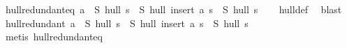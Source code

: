 \begin{isabellebody}
\endisatagproof
{\isafoldproof}%
%
\isadelimproof
\isanewline
%
\endisadelimproof
\isanewline
{}\isamarkupfalse%
\ hull{\isacharunderscore}{\kern0pt}redundant{\isacharunderscore}{\kern0pt}eq{\isacharcolon}{\kern0pt}\ {\isachardoublequoteopen}a\ {\isasymin}\ {\isacharparenleft}{\kern0pt}S\ hull\ s{\isacharparenright}{\kern0pt}\ {\isasymlongleftrightarrow}\ S\ hull\ {\isacharparenleft}{\kern0pt}insert\ a\ s{\isacharparenright}{\kern0pt}\ {\isacharequal}{\kern0pt}\ S\ hull\ s{\isachardoublequoteclose}\isanewline
%
\isadelimproof
\ \ %
\endisadelimproof
%
\isatagproof
{}\isamarkupfalse%
\ hull{\isacharunderscore}{\kern0pt}def\ \isamarkupfalse%
\ blast%
\endisatagproof
{\isafoldproof}%
%
\isadelimproof
\isanewline
%
\endisadelimproof
\isanewline
{}\isamarkupfalse%
\ hull{\isacharunderscore}{\kern0pt}redundant{\isacharcolon}{\kern0pt}\ {\isachardoublequoteopen}a\ {\isasymin}\ {\isacharparenleft}{\kern0pt}S\ hull\ s{\isacharparenright}{\kern0pt}\ {\isasymLongrightarrow}\ S\ hull\ {\isacharparenleft}{\kern0pt}insert\ a\ s{\isacharparenright}{\kern0pt}\ {\isacharequal}{\kern0pt}\ S\ hull\ s{\isachardoublequoteclose}\isanewline
%
\isadelimproof
\ \ %
\endisadelimproof
%
\isatagproof
{}\isamarkupfalse%
\ {\isacharparenleft}{\kern0pt}metis\ hull{\isacharunderscore}{\kern0pt}redundant{\isacharunderscore}{\kern0pt}eq{\isacharparenright}{\kern0pt}%
\endisatagproof
{\isafoldproof}%
%
\isadelimproof
\isanewline
%
\endisadelimproof
%
\isadelimtheory
\isanewline
%
\endisadelimtheory
%
\isatagtheory
{}\isamarkupfalse%
%
\endisatagtheory
{\isafoldtheory}%
%
\isadelimtheory
%
\endisadelimtheory
%
\end{isabellebody}%
\endinput
